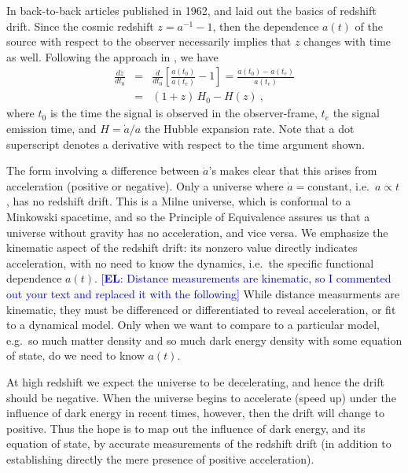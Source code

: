 \documentclass[preprint2, 10pt]{aastex}
\newcommand{\bea}{\begin{eqnarray}}
\newcommand{\eea}{\end{eqnarray}}
\newcommand{\eric}[1]{\textcolor{blue}{[{\bf EL}: #1]}}
\begin{document}
In back-to-back articles published in 1962, \citet{mcvittie} and 
\citet{sandage} laid out the basics of redshift drift.  Since the 
cosmic redshift $z=a^{-1}-1$, then the dependence $a(t)$ of the source with 
respect to the observer necessarily implies that $z$ changes with time as 
well. Following the approach in \citet{fpoc}, we have 
\bea 
\frac{dz}{dt_0}&=&\frac{d}{dt_0}\left[\frac{a(t_0)}{a(t_e)}-1\right] 
=\frac{\dot a(t_0)-\dot a (t_e)}{a(t_e)}\\ 
&=&(1+z)\,H_0-H(z)\ , 
\eea 
where $t_0$ is the time the signal is observed in the observer-frame, 
$t_e$ the signal emission time, and $H=\dot a/a$ the Hubble expansion rate. 
Note that a dot superscript denotes a derivative with respect to the 
time argument shown. 

The form involving a difference 
between $\dot a$'s makes clear that this arises from acceleration (positive 
or negative).
Only a universe where $\dot a=\mbox{constant}$, i.e.\ $a\propto t$, 
has no redshift drift.  This is a Milne universe, which is conformal to a 
Minkowski spacetime, and so the Principle of Equivalence assures us that 
a universe without gravity has no acceleration, and vice versa. 
We emphasize the kinematic aspect of the redshift drift: its nonzero 
value directly indicates acceleration, with no need to know the dynamics, 
i.e.\ the specific functional dependence $a(t)$. 
\eric{Distance measurements are kinematic, so I commented out your text 
and replaced it with the following} 
While distance measurments are kinematic, they must be differenced or 
differentiated to reveal acceleration, or fit to a dynamical model. 
Only when we want to compare 
to a particular model, e.g.\ so much matter density and so much dark energy 
density with some equation of state, do we need to know $a(t)$. 

At high redshift we expect the universe to be decelerating, and hence 
the drift should be negative.  When the universe begins to accelerate 
(speed up) under the influence of dark energy in recent times, however, 
then the drift will change to positive.  Thus the hope is to map out the 
influence of dark energy, and its equation of state, by accurate 
measurements of the redshift drift (in addition to establishing directly 
the mere presence of positive acceleration). 
\end{document}
